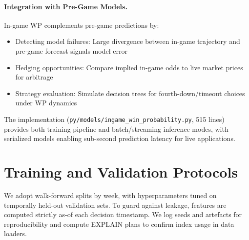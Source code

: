 \paragraph{Integration with Pre-Game Models.}
In-game WP complements pre-game predictions by:
\begin{itemize}
\item Detecting model failures: Large divergence between in-game trajectory and pre-game forecast signals model error
\item Hedging opportunities: Compare implied in-game odds to live market prices for arbitrage
\item Strategy evaluation: Simulate decision trees for fourth-down/timeout choices under WP dynamics
\end{itemize}

The implementation (\texttt{py/models/ingame\_win\_probability.py}, 515 lines) provides both training pipeline and batch/streaming inference modes, with serialized models enabling sub-second prediction latency for live applications.

\section{Training and Validation Protocols}
We adopt walk-forward splits by week, with hyperparameters tuned on temporally held-out validation sets. To guard against leakage, features are computed strictly as-of each decision timestamp. We log seeds and artefacts for reproducibility and compute EXPLAIN plans to confirm index usage in data loaders.

